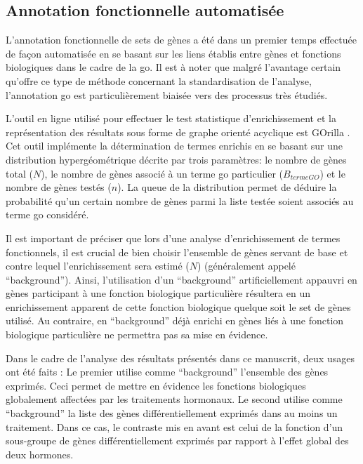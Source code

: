 \documentclass[../main.tex]{subfiles}
\begin{document}
	\subsection{Annotation fonctionnelle automatisée}
		L'annotation fonctionnelle de sets de gènes a été dans un premier temps effectuée de façon automatisée en se basant sur les liens établis entre gènes et fonctions biologiques dans le cadre de la \gls{go}.
		Il est à noter que malgré l'avantage certain qu'offre ce type de méthode concernant la standardisation de l'analyse, l'annotation \gls{go} est particulièrement biaisée vers des processus très étudiés.
		\par
		L'outil en ligne utilisé pour effectuer le test statistique d'enrichissement et la représentation des résultats sous forme de graphe orienté acyclique est GOrilla \citep{Eden2009}.
		Cet outil implémente la détermination de termes enrichis en se basant sur une distribution hypergéométrique décrite par trois paramètres:
		le nombre de gènes total ($N$), le nombre de gènes associé à un terme \gls{go} particulier ($B_{terme GO}$) et le nombre de gènes testés ($n$).
		La queue de la distribution permet de déduire la probabilité qu'un certain nombre de gènes parmi la liste testée soient associés au terme \gls{go} considéré.
		\par
		Il est important de préciser que lors d'une analyse d'enrichissement de termes fonctionnels, il est crucial de bien choisir l'ensemble de gènes servant de base et contre lequel l'enrichissement sera estimé ($N$) (généralement appelé ``background'').
		Ainsi, l'utilisation d'un ``background'' artificiellement appauvri en gènes participant à une fonction biologique particulière résultera en un enrichissement apparent de cette fonction biologique quelque soit le set de gènes utilisé.
		Au contraire, en ``background'' déjà enrichi en gènes liés à une fonction biologique particulière ne permettra pas sa mise en évidence.
		\par
		Dans le cadre de l'analyse des résultats présentés dans ce manuscrit, deux usages ont été faits :
		Le premier utilise comme ``background'' l'ensemble des gènes exprimés.
		Ceci permet de mettre en évidence les fonctions biologiques globalement affectées par les traitements hormonaux.
		Le second utilise comme ``background'' la liste des gènes différentiellement exprimés dans au moins un traitement.
		Dans ce cas, le contraste mis en avant est celui de la fonction d'un sous-groupe de gènes différentiellement exprimés par rapport à l'effet global des deux hormones.
\end{document}
